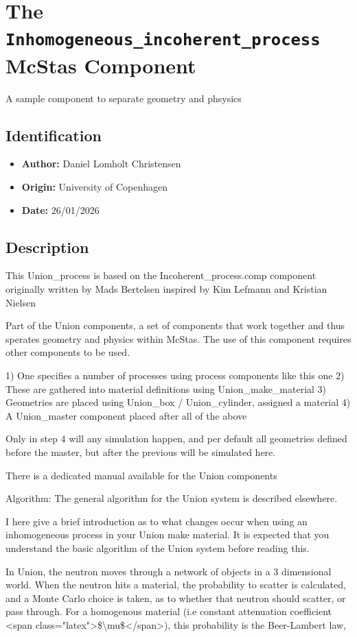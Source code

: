 \section{The \texttt{Inhomogeneous\_incoherent\_process} McStas Component}
A sample component to separate geometry and phsysics

\subsection*{Identification}
\begin{itemize}
  \item \textbf{Author:} Daniel Lomholt Christensen
  \item \textbf{Origin:} University of Copenhagen
  \item \textbf{Date:} 26/01/2026
\end{itemize}

\subsection*{Description}
This Union\_process is based on the Incoherent\_process.comp component originally written by Mads Bertelsen inspired by Kim Lefmann and Kristian Nielsen

Part of the Union components, a set of components that work together and thus sperates geometry and physics within McStas. The use of this component requires other components to be used.

1) One specifies a number of processes using process components like this one 2) These are gathered into material definitions using Union\_make\_material 3) Geometries are placed using Union\_box / Union\_cylinder, assigned a material 4) A Union\_master component placed after all of the above

Only in step 4 will any simulation happen, and per default all geometries defined before the master, but after the previous will be simulated here.

There is a dedicated manual available for the Union components

Algorithm: The general algorithm for the Union system is described elsewhere.

I here give a brief introduction as to what changes occur when using an inhomogeneous process in your Union make material. It is expected that you understand the basic algorithm of the Union system before reading this.

In Union, the neutron moves through a network of objects in a 3 dimensional world. When the neutron hits a material, the probability to scatter is calculated, and a Monte Carlo choice is taken, as to whether that neutron should scatter, or pass through. For a homogenous material (i.e constant attenuation coefficient \textless{}span class="latex"\textgreater{}\$\textbackslash{}mu\$\textless{}/span\textgreater{}), this probability is the Beer-Lambert law,

